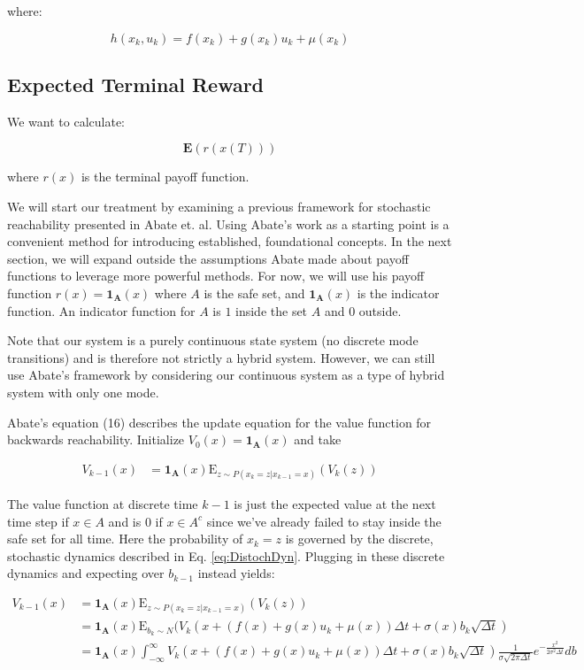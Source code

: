 \documentclass[a4paper]{article}
\begin{document}
where:

$$
h(x_k,u_k) = f(x_k) + g(x_k) u_k + \mu(x_k)
$$

\subsection{Expected Terminal Reward}
We want to calculate:

$$
\mathbf{E}(r(x(T)))
$$

where $r(x)$ is the terminal payoff function.

We will start our treatment by examining a previous framework for stochastic reachability presented in Abate et. al. \cite{AbateStoch}
Using Abate's work as a starting point is a convenient method for introducing established, foundational concepts.
In the next section, we will expand outside the assumptions Abate made about payoff functions to leverage more powerful methods.
For now, we will use his payoff function $r(x) = \mathbf{1_A}(x)$ where $A$ is the safe set, and $\mathbf{1_A}(x)$ is the indicator function.
An indicator function for $A$ is $1$ inside the set $A$ and $0$ outside.

Note that our system is a purely continuous state system (no discrete mode transitions) and is therefore not strictly a hybrid system.
However, we can still use Abate's framework by considering our continuous system as a type of hybrid system with only one mode.

Abate's equation (16) describes the update equation for the value function for backwards reachability.
Initialize $V_0(x) = \mathbf{1_A}(x)$ and take

\begin{align}
V_{k-1}(x) & = \mathbf{1_A}(x) \mathrm{E}_{z \sim P(x_k = z | x_{k-1}=x)} (V_k(z))
\end{align}

The value function at discrete time $k-1$ is just the expected value at the next time step if $x \in A$ and is 0 if $x \in A^c$ since we've already failed to stay inside the safe set for all time.
Here the probability of $x_k = z$ is governed by the discrete, stochastic dynamics described in Eq. \ref{eq:DistochDyn}.
Plugging in these discrete dynamics and expecting over $b_{k-1}$ instead yields:

\begin{align}
V_{k-1}(x) & = \mathbf{1_A}(x) \mathrm{E}_{z \sim P(x_k = z | x_{k-1}=x)} (V_k(z))
\\ & = \mathbf{1_A}(x) \mathrm{E}_{b_k\sim N} (V_k( x + (f(x) + g(x) u_k + \mu(x)) \Delta t + \sigma(x) b_k \sqrt{\Delta t} )
\\ & = \mathbf{1_A}(x) \int_{-\infty}^{\infty} V_k( x + (f(x) + g(x) u_k + \mu(x)) \Delta t + \sigma(x) b_k \sqrt{\Delta t} )      \frac{1}{\sigma \sqrt{2 \pi \Delta t}} e^{-\frac{x^2}{2 \sigma^2 \Delta t}} db
\label{eq:AbateBrute}
\end{align}
\end{document}
